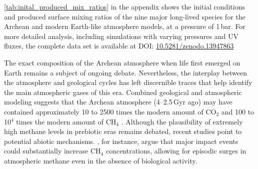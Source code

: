 
\autoref{tab:inital_produced_mix_ratios} in the appendix shows the initial conditions and produced surface mixing ratios of the nine major long-lived species for the Archean and modern Earth-like atmosphere models, at a pressure of 1\,bar. For more detailed analysis, including simulations with varying pressures and UV fluxes, the complete data set is available at DOI: \href{https://doi.org/10.5281/zenodo.13947863}{10.5281/zenodo.13947863}

The exact composition of the Archean atmosphere when life first emerged on Earth remains a subject of ongoing debate. Nevertheless, the interplay between the atmosphere and geological cycles has left discernible traces that help identify the main atmospheric gases of this era. Combined geological and atmospheric modeling suggests that the Archean atmosphere (4--2.5\,Gyr ago) may have contained approximately 10 to 2500 times the modern amount of CO$_2$ and 100 to 10$^4$ times the modern amount of CH$_4$ \citep[see][]{Catling20}.
Although the plausibility of extremely high methane levels in prebiotic eras remains debated, recent studies point to potential abiotic mechanisms. \cite{Wogan.et.al.2023PSJ.....4..169W}, for instance, argue that major impact events could substantially increase CH$_4$ concentrations, allowing for episodic surges in atmospheric methane even in the absence of biological activity.

